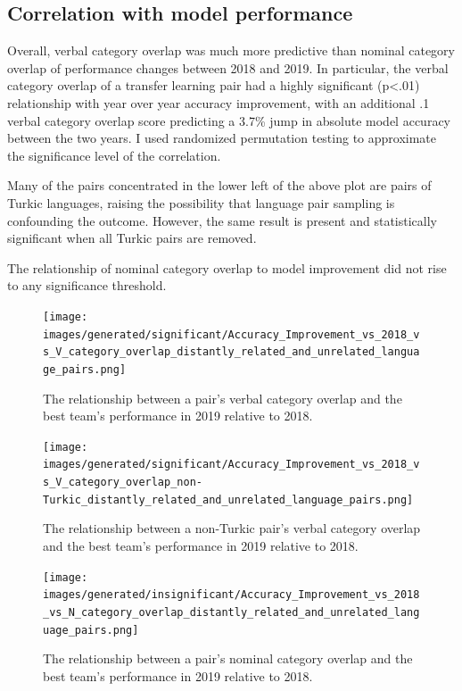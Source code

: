 \subsection{Correlation with model performance}

Overall, verbal category overlap was much more predictive than nominal category overlap of performance changes between 2018 and 2019. In particular, the verbal category overlap of a transfer learning pair had a highly significant (p<.01) relationship with year over year accuracy improvement, with an additional .1 verbal category overlap score predicting a 3.7\% jump in absolute model accuracy between the two years. I used randomized permutation testing to approximate the significance level of the correlation.

Many of the pairs concentrated in the lower left of the above plot are pairs of Turkic languages, raising the possibility that language pair sampling is confounding the outcome. However, the same result is present and statistically significant when all Turkic pairs are removed.  

The relationship of nominal category overlap to model improvement did not rise to any significance threshold.

\begin{figure}[ht]
\texttt{[image: images/generated/significant/Accuracy\_Improvement\_vs\_2018\_vs\_V\_category\_overlap\_distantly\_related\_and\_unrelated\_language\_pairs.png]}
\centering
\caption{The relationship between a pair's verbal category overlap and the best team's performance in 2019 relative to 2018.}
\end{figure}

\begin{figure}[p]
\texttt{[image: images/generated/significant/Accuracy\_Improvement\_vs\_2018\_vs\_V\_category\_overlap\_non-Turkic\_distantly\_related\_and\_unrelated\_language\_pairs.png]}
\centering
\caption{The relationship between a non-Turkic pair's verbal category overlap and the best team's performance in 2019 relative to 2018.}
\end{figure}

\begin{figure}[p]
\texttt{[image: images/generated/insignificant/Accuracy\_Improvement\_vs\_2018\_vs\_N\_category\_overlap\_distantly\_related\_and\_unrelated\_language\_pairs.png]}
\centering
\caption{The relationship between a pair's nominal category overlap and the best team's performance in 2019 relative to 2018.}
\end{figure}

